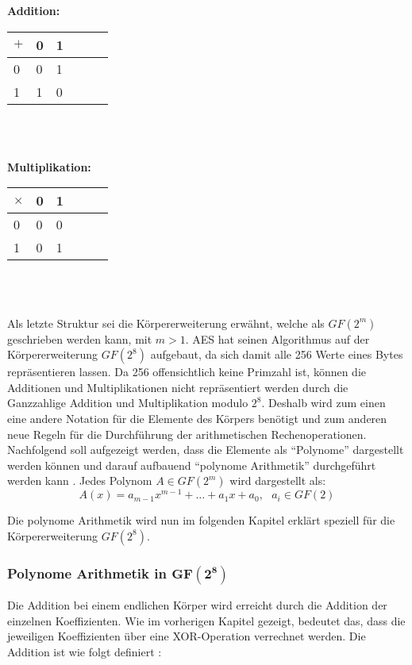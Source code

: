  \begin{minipage}{0.5\textwidth}
\textbf{Addition:} \\
    \begin{tabular}{l|lllll}
    $+$  & 0 & 1 \\ \hline
    0 	  & 0 & 1 \\
    1       & 1 & 0 \\
    \end{tabular}
    \\
    \\
\end{minipage}
\begin{minipage}{0.5\textwidth}
\textbf{Multiplikation:} \\
    \begin{tabular}{l|lllll}
    $\times$ & 0 & 1 \\ \hline
    0 	        & 0 & 0 \\
    1             & 0 & 1 \\
    \end{tabular}
    \\
    \\
\end{minipage}
 
 Als letzte Struktur sei die Körpererweiterung erwähnt, welche als $GF(2^m)$ geschrieben werden kann,
 mit $m > 1$. AES hat seinen Algorithmus auf der Körpererweiterung $GF(2^8)$ aufgebaut, da sich damit
 alle 256 Werte eines Bytes repräsentieren lassen. Da 256 offensichtlich keine Primzahl ist, können die
 Additionen und Multiplikationen nicht repräsentiert werden durch die Ganzzahlige Addition und Multiplikation
 modulo $2^8$. Deshalb wird zum einen eine andere Notation für die Elemente des Körpers benötigt und
 zum anderen neue Regeln für die Durchführung der arithmetischen Rechenoperationen. Nachfolgend soll
 aufgezeigt werden, dass die Elemente als ``Polynome'' dargestellt werden können und darauf aufbauend
 ``polynome Arithmetik'' durchgeführt werden kann \cite{paar10}. Jedes Polynom $A \in GF(2^m)$ wird
 dargestellt als:
 \begin{equation*}
   A(x) = a_{m-1}x^{m-1} + \hdots + a_1x + a_0, ~~~ a_i \in GF(2)
 \end{equation*}
 
 Die polynome Arithmetik wird nun im folgenden Kapitel erklärt speziell für die Körpererweiterung
 $GF(2^8)$.
 
 \subsubsection{Polynome Arithmetik in $\mathbf{GF(2^8)}$}
 \label{polynome-arithmetic}
 Die Addition bei einem endlichen Körper wird erreicht durch die Addition der einzelnen Koeffizienten. Wie
 im vorherigen Kapitel gezeigt, bedeutet das, dass die jeweiligen Koeffizienten über eine XOR-Operation
 verrechnet werden. Die Addition ist wie folgt definiert \cite{paar10}:
 
